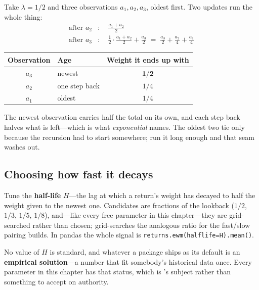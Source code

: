 \begin{example}\label{ex:ewma-half}
Take $\lambda = 1/2$ and three observations $a_1, a_2, a_3$, oldest first. Two updates run the whole
thing:
\begin{align*}
  \text{after } a_2 &: \quad \frac{a_1 + a_2}{2} \\
  \text{after } a_3 &: \quad \frac{1}{2} \cdot \frac{a_1 + a_2}{2} + \frac{a_3}{2}
                       \;=\; \frac{a_3}{2} + \frac{a_2}{4} + \frac{a_1}{4}
\end{align*}

\begin{center}
\begin{tabular}{|c|l|c|}
\hline
\textbf{Observation} & \textbf{Age} & \textbf{Weight it ends up with} \\ \hline
$a_3$ & newest        & $\mathbf{1/2}$ \\ \hline
$a_2$ & one step back & $1/4$ \\ \hline
$a_1$ & oldest        & $1/4$ \\ \hline
\end{tabular}
\end{center}

The newest observation carries half the total on its own, and each step back halves what is
left---which is what \emph{exponential} names. The oldest two tie only because the recursion had to
start somewhere; run it long enough and that seam washes out.
\end{example}

\subsection{Choosing how fast it decays}\label{sec:half-life}

Tune the \textbf{half-life} $H$---the lag at which a return's weight has decayed to half the weight
given to the newest one. Candidates are fractions of the lookback ($1/2$, $1/3$, $1/5$, $1/8$),
and---like every free parameter in this chapter---they are grid-searched rather than chosen;
 grid-searches the analogous ratio for the fast/slow pairing
 builds. In pandas the whole signal is
\texttt{returns.ewm(halflife=H).mean()}.

No value of $H$ is standard, and whatever a package ships as its default is an \textbf{empirical
solution}---a number that fit somebody's historical data once. Every parameter in this chapter has
that status, which is 's subject rather than something
to accept on authority.


